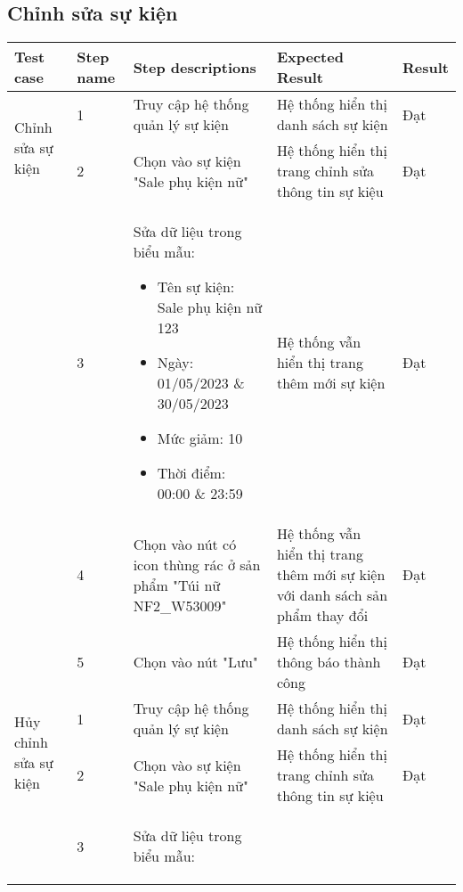 \subsection{Chỉnh sửa sự kiện}
{
    \setlength\extrarowheight{6pt}
    \begin{longtable}{| p{2.5cm}| p{1cm}| p{5.5cm}| p{4.5cm} | p{1.5cm} |}
        \hline
        \textbf{Test case} & \textbf{Step name} & \textbf{Step descriptions} & \textbf{Expected Result} & \textbf{Result} \\
        \hline
        \multirow[t]{2}{2.5cm}{Chỉnh sửa sự kiện} & 1 & Truy cập hệ thống quản lý sự kiện & Hệ thống hiển thị danh sách sự kiện & Đạt \\
        \cline{2-5}
         & 2 & Chọn vào sự kiện "Sale phụ kiện nữ" & Hệ thống hiển thị trang chỉnh sửa thông tin sự kiệu & Đạt \\
        \cline{2-5}
        & 3 & Sửa dữ liệu trong biểu mẫu:
        \begin{itemize}
            \item Tên sự kiện: Sale phụ kiện nữ 123
            \item Ngày: 01/05/2023 \& 30/05/2023
            \item Mức giảm: 10
            \item Thời điểm: 00:00 \& 23:59 
        \end{itemize} & Hệ thống vẫn hiển thị trang thêm mới sự kiện & Đạt \\
        \cline{2-5}
         & 4 & Chọn vào nút có icon thùng rác ở sản phẩm "Túi nữ NF2\_W53009" & Hệ thống vẫn hiển thị trang thêm mới sự kiện với danh sách sản phẩm thay đổi & Đạt \\
         \cline{2-5}
         & 5 & Chọn vào nút "Lưu" & Hệ thống hiển thị thông báo thành công & Đạt \\
        \hline
        \multirow[t]{2}{2.5cm}{Hủy chỉnh sửa sự kiện} & 1 & Truy cập hệ thống quản lý sự kiện & Hệ thống hiển thị danh sách sự kiện & Đạt \\
        \cline{2-5}
         & 2 & Chọn vào sự kiện "Sale phụ kiện nữ" & Hệ thống hiển thị trang chỉnh sửa thông tin sự kiệu & Đạt \\
        \cline{2-5}
        & 3 & Sửa dữ liệu trong biểu mẫu:
        \begin{itemize}

\end{itemize}
\end{longtable}}
